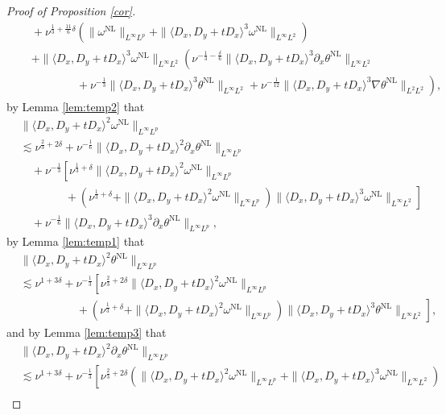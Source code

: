 \documentclass[reqno, 12pt]{amsart} %
\theoremstyle{plain} %
\theoremstyle{definition}
\theoremstyle{remark}
\numberwithin{equation}{section} %
\newcommand{\lt}{\left}
\newcommand{\rt}{\right}
\newcommand{\px}{\partial_x}
\begin{document}
\begin{proof}[Proof of Proposition \ref{cor}]
\begin{equation*}
\begin{aligned}
				& \quad + \nu^{\frac13 + \frac{11}{6}\delta}  \lt(  \|\omega^{\mathrm{NL}}\|_{L^\infty L^p}   + \|\langle D_x, D_y+t D_x\rangle^3 \omega^{\mathrm{NL}}\|_{L^\infty L^2} \rt)  \\
				& \quad  +   \|\langle D_x, D_y+t D_x\rangle^3 \omega^{\mathrm{NL}}\|_{L^\infty L^2} \lt( \nu^{-\frac13 -\frac\delta6 } \|\langle D_x, D_y+t D_x\rangle^3 \px \theta^{\mathrm{NL}}\|_{L^\infty L^2}   \rt. \\
				&\lt.\qquad \qquad \quad + \nu^{-\frac13}  \|\langle D_x, D_y+t D_x\rangle^3 \theta^{\mathrm{NL}}\|_{L^\infty L^2} + \nu^{-\frac{1}{12}} \|\langle D_x, D_y+t D_x\rangle^3 \nabla \theta^{\mathrm{NL}}\|_{L^2 L^2} \rt) ,
		\end{aligned}\end{equation*}
		by Lemma \ref{lem:temp2} that
		$$
		\begin{aligned}
			&\|\langle D_x, D_y+t D_x\rangle^2 \omega^{\mathrm{NL}}\|_{L^\infty L^p} \\
			&\lesssim  \nu^{\frac23 + 2\delta} +   \nu^{-\frac16}\|\langle D_x, D_y+t D_x\rangle^2 \px \theta^{\mathrm{NL}} \|_{L^\infty L^p}  \\
			& \quad+\nu^{-\frac13} \left[   \nu^{\frac13+ \delta}  \|\langle D_x, D_y+t D_x\rangle^2 \omega^{\mathrm{NL}}\|_{L^\infty L^p} \right. \\
			& \left.\qquad \qquad +(\nu^{\frac13+ \delta} +\|\langle D_x, D_y+t D_x\rangle^2 \omega^{\mathrm{NL}}\|_{L^\infty L^p})\|\langle D_x, D_y+t D_x\rangle^3 \omega^{\mathrm{NL}}\|_{L^\infty L^2}\right]\\
			&\quad +\nu^{-\frac16}\|\langle D_x, D_y+t D_x\rangle^3 \partial_{x}\theta^{\mathrm{NL}}\|_{L^\infty L^p},
		\end{aligned}
		$$
		by Lemma \ref{lem:temp1} that
		$$
		\begin{aligned}
			&\|\langle D_x, D_y+t D_x\rangle^2 \theta^{\mathrm{NL}}\|_{L^\infty L^p} \\
			& \lesssim  \nu^{1 + 3\delta} 
			+  \nu^{-\frac13}  \left[   \nu^{\frac23 + 2 \delta}\|\langle D_x, D_y+t D_x\rangle^2 \omega^{\mathrm{NL}}\|_{L^\infty L^p}  \right. \\
			& \left. \qquad \qquad \quad+(\nu^{\frac13 + \delta}+\|\langle D_x, D_y+t D_x\rangle^2 \omega^{\mathrm{NL}}\|_{L^\infty L^p})\|\langle D_x, D_y+t D_x\rangle^3 \theta^{\mathrm{NL}}\|_{L^\infty L^2}\right],
		\end{aligned}
		$$
		and by Lemma \ref{lem:temp3} that
		$$
		\begin{aligned}
			& \|\langle D_x, D_y + t D_x\rangle^2 \px \theta^{\mathrm{NL}}\|_{L^\infty L^p}  \\ &\lesssim \nu^{1 + 3\delta}  +  \nu^{-\frac13}\lt[  \nu^{\frac23 + 2\delta} (\|\langle D_x, D_y+t D_x\rangle^2 \omega^{\mathrm{NL}}\|_{L^\infty L^p}  + \|\langle D_x, D_y+t D_x\rangle^3 \omega^{\mathrm{NL}}\|_{L^\infty L^2} )  \rt.\\

\end{aligned}$$
\end{proof}
\end{document}
